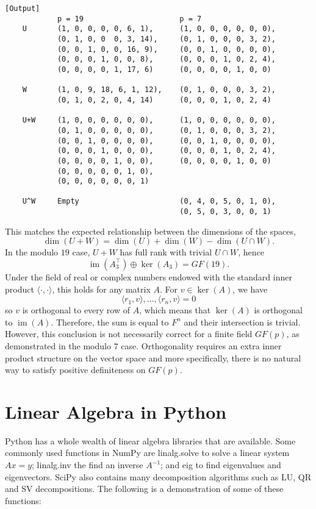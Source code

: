 \documentclass{article}
\begin{document}
\begin{verbatim}[Output]
            p = 19                      p = 7
    U       (1, 0, 0, 0, 0, 6, 1),      (1, 0, 0, 0, 0, 0, 0),
            (0, 1, 0, 0  0, 3, 14),     (0, 1, 0, 0, 0, 3, 2),
            (0, 0, 1, 0, 0, 16, 9),     (0, 0, 1, 0, 0, 0, 0),
            (0, 0, 0, 1, 0, 0, 8),      (0, 0, 0, 1, 0, 2, 4),
            (0, 0, 0, 0, 1, 17, 6)      (0, 0, 0, 0, 1, 0, 0)
                
    W       (1, 0, 9, 18, 6, 1, 12),    (0, 1, 0, 0, 0, 3, 2),
            (0, 1, 0, 2, 0, 4, 14)      (0, 0, 0, 1, 0, 2, 4)
                
    U+W     (1, 0, 0, 0, 0, 0, 0),      (1, 0, 0, 0, 0, 0, 0),
            (0, 1, 0, 0, 0, 0, 0),      (0, 1, 0, 0, 0, 3, 2),
            (0, 0, 1, 0, 0, 0, 0),      (0, 0, 1, 0, 0, 0, 0),
            (0, 0, 0, 1, 0, 0, 0),      (0, 0, 0, 1, 0, 2, 4),
            (0, 0, 0, 0, 1, 0, 0),      (0, 0, 0, 0, 1, 0, 0)
            (0, 0, 0, 0, 0, 1, 0), 
            (0, 0, 0, 0, 0, 0, 1)           
                
    U^W     Empty                       (0, 4, 0, 5, 0, 1, 0),
                                        (0, 5, 0, 3, 0, 0, 1)
\end{verbatim}
This matches the expected relationship between the dimensions of the spaces,
\[ \dim(U + W) = \dim(U) + \dim(W) - \dim(U \cap W). \]
In the modulo \(19\) case, \(U + W\) has full rank with trivial \(U \cap W\), hence
\[ \mathop{\mathrm{im}}(A_3^\top) \oplus \ker(A_3) = GF(19). \]
Under the field of real or complex numbers endowed with the standard inner product \(\langle\cdot, \cdot\rangle\), this holds for any matrix \(A\). For \(v \in \ker(A)\), we have
\[ \langle r_1, v \rangle, \dots, \langle r_n, v \rangle = 0 \]
so \(v\) is orthogonal to every row of \(A\), which means that \(\ker(A)\) is orthogonal to \(\mathop{\mathrm{im}}(A)\). Therefore, the sum is equal to \(F^n\) and their intersection is trivial. However, this conclusion is not necessarily correct for a finite field \(GF(p)\), as demonstrated in the modulo \(7\) case. Orthogonality requires an extra inner product structure on the vector space and more specifically, there is no natural way to satisfy positive definiteness on \(GF(p)\).

\section{Linear Algebra in Python}

Python has a whole wealth of linear algebra libraries that are available. Some commonly used functions in NumPy are linalg.solve to solve a linear system \(Ax = y\); linalg.inv the find an inverse \(A^{-1}\); and eig to find eigenvalues and eigenvectors. SciPy also contains many decomposition algorithms such as LU, QR and SV decompositions. The following is a demonstration of some of these functions:
\end{document}
